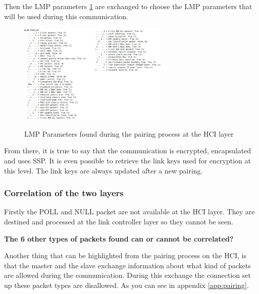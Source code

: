 Then the LMP parameters \ref{fig:lmp} are exchanged to choose the LMP parameters that will be used during this communication. 
\begin{figure}[!h]
  \begin{center}
	\includegraphics[width=270px]{images/LMP_PARAM.jpg}
	\label{fig:lmp}
	\caption{LMP Parameters found during the pairing process at the HCI layer}
  \end{center}
\end{figure}

From there, it is true to say that the communication is encrypted, encapsulated and uses SSP. It is even possible to retrieve the link keys used for encryption at this level. The link keys are always updated after a new pairing.

\subsubsection{Correlation of the two layers}

Firstly the POLL and NULL packet are not available at the HCI layer. They are destined and processed at the link controller layer so they cannot be seen.

\textbf{The 6 other types of packets found can or cannot be correlated?}

Another thing that can be highlighted from the pairing process on the HCI, is that the master and the slave exchange information about what kind of packets are allowed during the communication. During this exchange the connection set up these packet types are disallowed. As you can see in appendix \ref{app:pairing}.  \pend



